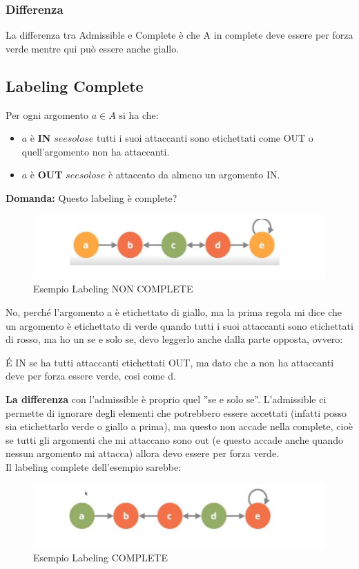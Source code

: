     \subsubsection{\textbf{Differenza}}
    La differenza tra Admissible e Complete è che A in complete deve essere per forza verde mentre qui può essere anche giallo.
    \newpage
    \subsection{Labeling Complete}
    Per ogni argomento $a \in A$ si ha che:
    \begin{itemize}
        \item  $a$ è \textbf{IN} $se e solo se$ tutti i suoi attaccanti sono etichettati come OUT o quell'argomento non ha attaccanti.
        \item $a$ è \textbf{OUT} $se e solo se$ è attaccato da almeno un argomento IN.
    \end{itemize}
    \textbf{Domanda: } Questo labeling è complete?
    \begin{figure}[H]
        \centering
        \includegraphics[width=12cm, keepaspectratio]{img/Cap7/LC.png}
        \caption{Esempio Labeling NON COMPLETE}
    \end{figure}

    No, perché l'argomento a è etichettato di giallo, ma la prima regola mi dice che un argomento è etichettato di verde quando tutti i suoi attaccanti sono etichettati di rosso, ma ho un se e solo se, devo leggerlo anche dalla parte opposta, ovvero:

    \vspace{0.3cm}
    \noindent É IN se ha tutti attaccanti etichettati OUT, ma dato che a non ha attaccanti deve per forza essere verde, cosi come d.

    \vspace{0.3cm}

    \noindent \textbf{La differenza} con l'admissible è proprio quel ”se e solo se”. L'admissible ci permette di ignorare degli elementi che potrebbero essere accettati (infatti posso sia etichettarlo verde o giallo a prima), ma questo non accade nella complete, cioè se tutti gli argomenti che mi attaccano sono out (e questo
    accade anche quando nessun argomento mi attacca) allora devo essere per forza verde.
    \\
    Il labeling complete dell'esempio sarebbe:
    \begin{figure}[H]
        \centering
        \includegraphics[width=12cm, keepaspectratio]{img/Cap7/LC2.png}
        \caption{Esempio Labeling COMPLETE}
    \end{figure}

